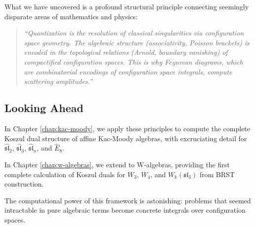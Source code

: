 What we have uncovered is a profound structural principle connecting seemingly disparate areas of mathematics and physics:

\begin{quote}
\textit{``Quantization is the resolution of classical singularities via configuration space geometry. The algebraic structure (associativity, Poisson brackets) is encoded in the topological relations (Arnold, boundary vanishing) of compactified configuration spaces. This is why Feynman diagrams, which are combinatorial encodings of configuration space integrals, compute scattering amplitudes.''}
\end{quote}

\subsection{Looking Ahead}

In Chapter \ref{chap:kac-moody}, we apply these principles to compute the complete Koszul dual structure of affine Kac-Moody algebras, with excruciating detail for $\widehat{\mathfrak{sl}}_2$, $\widehat{\mathfrak{sl}}_3$, $\widehat{\mathfrak{sl}}_n$, and $\widehat{E}_8$.

In Chapter \ref{chap:w-algebras}, we extend to W-algebras, providing the first complete calculation of Koszul duals for $W_3$, $W_4$, and $W_k(\mathfrak{sl}_3)$ from BRST construction.

The computational power of this framework is astonishing: problems that seemed intractable in pure algebraic terms become concrete integrals over configuration spaces.


